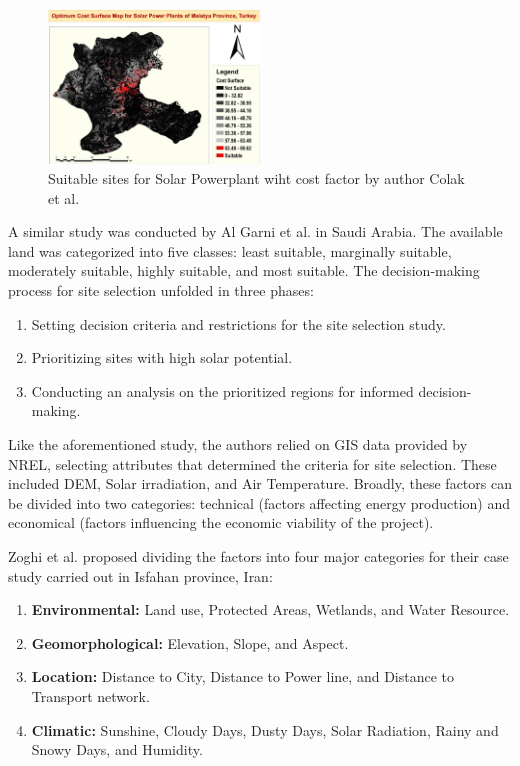 \documentclass[a4paper,12pt]{Classes/RoboticsLaTeX}
\begin{document}
	\begin{figure}[H]
		\centering
		\includegraphics[width=0.5\textwidth]{Figures/Colak.png} %
		\caption{Suitable sites for Solar Powerplant wiht cost factor by author Colak et al.\cite{colak2020}}
		\label{fig:my_label} %
	\end{figure}

	A similar study was conducted by Al Garni et al. in Saudi Arabia\cite{garni2017}. The available land was categorized into five classes: least suitable, marginally suitable, 
	moderately suitable, highly suitable, and most suitable. The decision-making process for site selection unfolded in three phases:
	\begin{enumerate}
		\item Setting decision criteria and restrictions for the site selection study.
		\item Prioritizing sites with high solar potential.
		\item Conducting an analysis on the prioritized regions for informed decision-making.
	\end{enumerate}

	Like the aforementioned study, the authors relied on GIS data provided by NREL, selecting attributes that determined the criteria for site selection. 
	These included DEM, Solar irradiation, and Air Temperature. Broadly, these factors can be divided into two categories: technical (factors affecting energy production) 
	and economical (factors influencing the economic viability of the project).

	Zoghi et al. proposed dividing the factors into four major categories for their case study carried out in Isfahan province, Iran\cite{zoghi2017}:
	\begin{enumerate}
		\item \textbf{Environmental:} Land use, Protected Areas, Wetlands, and Water Resource.
		\item \textbf{Geomorphological:} Elevation, Slope, and Aspect.
		\item \textbf{Location:} Distance to City, Distance to Power line, and Distance to Transport network.
		\item \textbf{Climatic:} Sunshine, Cloudy Days, Dusty Days, Solar Radiation, Rainy and Snowy Days, and Humidity.
	\end{enumerate}
\end{document}
